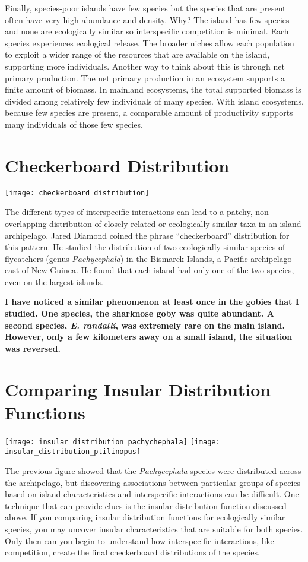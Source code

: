\documentclass{tufte-handout}
\begin{document}
Finally, species-poor islands have few species but the species that are present often have very high abundance and density. Why?  The island has few species and none are ecologically similar so interspecific competition is minimal.  Each species experiences ecological release.  The broader niches allow each population to exploit a wider range of the resources that are available on the island, supporting more individuals.  Another way to think about this is through net primary production. The net primary production in an ecosystem supports a finite amount of biomass. In mainland ecosystems, the total supported biomass is divided among relatively few individuals of many species. With island ecosystems, because few species are present, a comparable amount of productivity supports many individuals of those few species.

\section{Checkerboard Distribution}
\begin{marginfigure}
	\texttt{[image: checkerboard\_distribution]}
\end{marginfigure} 
The different types of interspecific interactions can lead to a patchy, non-overlapping distribution of closely related or ecologically similar taxa in an island archipelago.  Jared Diamond coined the phrase ``checkerboard'' distribution for this pattern.  He studied the distribution of two ecologically similar species of flycatchers (genus \textit{Pachycephala}) in the Bismarck Islands, a Pacific archipelago east of New Guinea.  He found that each island had only one of the two species, even on the largest islands.  

\textbf{I have noticed a similar phenomenon at least once in the gobies that I studied.  One species, the sharknose goby was quite abundant.  A second species, \textit{E. randalli}, was extremely rare on the main island.  However, only a few kilometers away on a small island, the situation was reversed.}


\section{Comparing Insular Distribution Functions}
\begin{marginfigure}
	\texttt{[image: insular\_distribution\_pachychephala]}
	\texttt{[image: insular\_distribution\_ptilinopus]}\\
\end{marginfigure}
The previous figure showed that the \textit{Pachycephala} species were distributed across the archipelago, but discovering  associations between particular groups of species based on island characteristics and interspecific interactions can be difficult.  One technique that can provide clues is the insular distribution function discussed above.  If you comparing insular distribution functions for ecologically similar species, you may uncover insular characteristics that are suitable for both species. Only then can you begin to understand how interspecific interactions, like competition, create the final checkerboard distributions of the species. 
\end{document}

